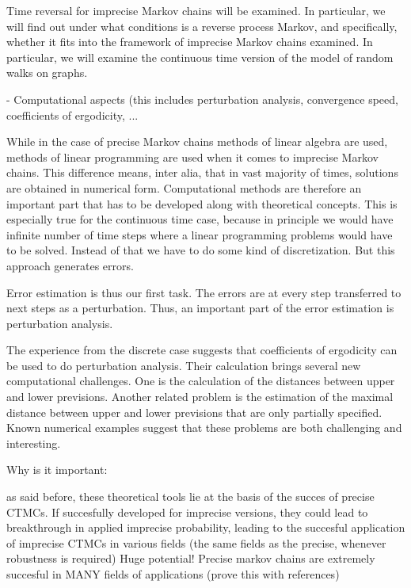 \documentclass[11pt,dvipsnames,usenames,a4paper]{article}
\begin{document}
Time reversal for imprecise Markov chains will be examined. 
In particular, we will find out under what conditions is a reverse process Markov, and specifically, whether it fits into the framework of imprecise Markov chains examined. 
In particular, we will examine the continuous time version of the model of random walks on graphs.  


- Computational aspects (this includes perturbation analysis, convergence speed, coefficients of ergodicity, ...

While in the case of precise Markov chains methods of linear algebra are used, methods of linear programming are used when it comes to imprecise Markov chains. 
This difference means, inter alia, that in vast majority of times, solutions are obtained in numerical form.
Computational methods are therefore an important part that has to be developed along with theoretical concepts. 
This is especially true for the continuous time case, because in principle we would have infinite number of time steps where a linear programming problems would have to be solved. 
Instead of that we have to do some kind of discretization. 
But this approach generates errors. 

Error estimation is thus our first task. 
The errors are at every step transferred to next steps as a perturbation. 
Thus, an important part of the error estimation is perturbation analysis. 

The experience from the discrete case suggests that coefficients of ergodicity can be used to do perturbation analysis. 
Their calculation brings several new computational challenges. 
One is the calculation of the distances between upper and lower previsions. 
Another related problem is the estimation of the maximal distance between upper and lower previsions that are only partially specified. 
Known numerical examples suggest that these problems are both challenging and interesting. 



Why is it important:

as said before, these theoretical tools lie at the basis of the succes of precise CTMCs. If succesfully developed for imprecise versions, they could lead to breakthrough in applied imprecise probability, leading to the succesful application of imprecise CTMCs in various fields (the same fields as the precise, whenever robustness is required) Huge potential! Precise markov chains are extremely succesful in MANY fields of applications (prove this with references)
\end{document}
